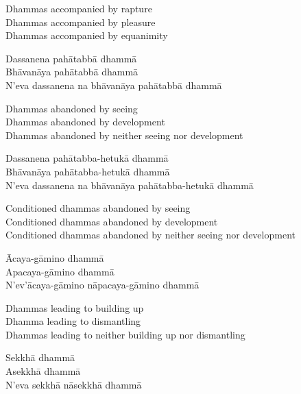 \begin{english-verses}
  Dhammas accompanied by rapture\\
  Dhammas accompanied by pleasure\\
  Dhammas accompanied by equanimity
\end{english-verses}

\begin{pali-hang-continued}
Dassanena pahātabbā dhammā\\
Bhāvanāya pahātabbā dhammā\\
N'eva dassanena na bhāvanāya pahātabbā dhammā
\end{pali-hang-continued}

\begin{english-verses}
  Dhammas abandoned by seeing\\
  Dhammas abandoned by development\\
  Dhammas abandoned by neither seeing nor development
\end{english-verses}

\begin{pali-hang-continued}
Dassanena pahātabba-hetukā dhammā\\
Bhāvanāya pahātabba-hetukā dhammā\\
N'eva dassanena na bhāvanāya pahātabba-hetukā dhammā
\end{pali-hang-continued}

\begin{english-verses}
  Conditioned dhammas abandoned by seeing\\
  Conditioned dhammas abandoned by development\\
  Conditioned dhammas abandoned by neither seeing nor development
\end{english-verses}

\begin{pali-hang-continued}
Ācaya-gāmino dhammā\\
Apacaya-gāmino dhammā\\
N'ev'ācaya-gāmino nāpacaya-gāmino dhammā
\end{pali-hang-continued}

\begin{english-verses}
  Dhammas leading to building up\\
  Dhamma leading to dismantling\\
  Dhammas leading to neither building up nor dismantling
\end{english-verses}

\begin{pali-hang-continued}
Sekkhā dhammā\\
Asekkhā dhammā\\
N'eva sekkhā nāsekkhā dhammā
\end{pali-hang-continued}

